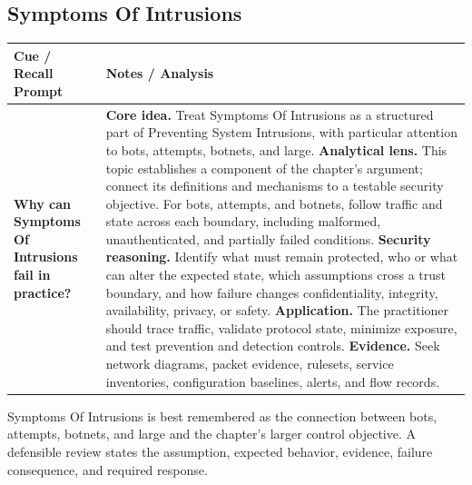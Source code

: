 \documentclass[11pt]{article}
\newcommand{\CornellHeader}{%
\rowcolor{Navy}\color{white}\bfseries Cue / Recall Prompt & \color{white}\bfseries Notes / Analysis\\\hline}
\newcommand{\CornellRow}[2]{%
\cellcolor{CueGray}\RaggedRight\textbf{#1} & \RaggedRight #2\\\hline}
\begin{document}
\subsection*{Symptoms Of Intrusions}
\begin{longtable}{>{\RaggedRight\arraybackslash}p{}|>{\RaggedRight\arraybackslash}p{}}
\CornellHeader
\CornellRow{Why can Symptoms Of Intrusions fail in practice?}{\textbf{Core idea.} Treat Symptoms Of Intrusions as a structured part of Preventing System Intrusions, with particular attention to bots, attempts, botnets, and large. \textbf{Analytical lens.} This topic establishes a component of the chapter's argument; connect its definitions and mechanisms to a testable security objective. For bots, attempts, and botnets, follow traffic and state across each boundary, including malformed, unauthenticated, and partially failed conditions. \textbf{Security reasoning.} Identify what must remain protected, who or what can alter the expected state, which assumptions cross a trust boundary, and how failure changes confidentiality, integrity, availability, privacy, or safety. \textbf{Application.} The practitioner should trace traffic, validate protocol state, minimize exposure, and test prevention and detection controls. \textbf{Evidence.} Seek network diagrams, packet evidence, rulesets, service inventories, configuration baselines, alerts, and flow records.}
\end{longtable}
\begin{topicsummary}
Symptoms Of Intrusions is best remembered as the connection between bots, attempts, botnets, and large and the chapter's larger control objective. A defensible review states the assumption, expected behavior, evidence, failure consequence, and required response.
\end{topicsummary}
\end{document}

